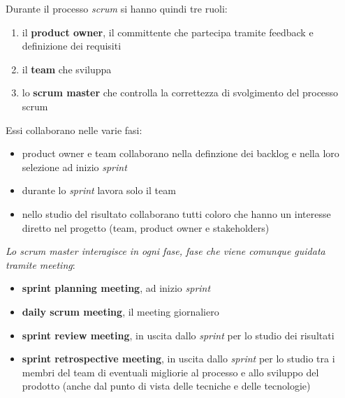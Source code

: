 \documentclass[a4paper,12pt, oneside]{book}
\begin{document}
Durante il processo \textit{scrum} si hanno quindi tre ruoli:
\begin{enumerate}
  \item il \textbf{product owner}, il committente che partecipa tramite feedback
  e definizione dei requisiti
  \item il \textbf{team} che sviluppa
  \item lo \textbf{scrum master} che controlla la correttezza di svolgimento del processo scrum 
\end{enumerate}
Essi collaborano nelle varie fasi:
\begin{itemize}
  \item product owner e team collaborano nella definzione dei backlog e nella
  loro selezione ad inizio \textit{sprint}
  \item durante lo \textit{sprint} lavora solo il team
  \item nello studio del risultato collaborano tutti coloro che hanno un
  interesse diretto nel progetto (team, product owner e stakeholders) 
\end{itemize}
\textit{Lo scrum master interagisce in ogni fase, fase che viene comunque
  guidata tramite meeting}:
\begin{itemize}
  \item \textbf{sprint planning meeting}, ad inizio \textit{sprint}
  \item \textbf{daily scrum meeting}, il meeting giornaliero
  \item \textbf{sprint review meeting}, in uscita dallo \textit{sprint} per lo
  studio dei risultati
  \item \textbf{sprint retrospective meeting}, in uscita dallo \textit{sprint}
  per lo studio tra i membri del team di eventuali migliorie al processo e allo
  sviluppo del prodotto (anche dal punto di vista delle tecniche e delle
  tecnologie)
\end{itemize}
\end{document}
